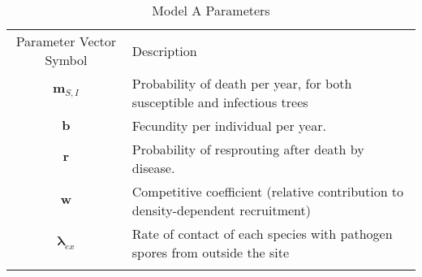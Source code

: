 \documentclass[english,nohyper,nofonts,nobib,nols,twoside]{tufte-handout}
\begin{document}
\begin{longtable}[c]{cl}
\hline\noalign{\medskip}
\begin{minipage}[b]{0.43\columnwidth}\centering
Parameter Vector Symbol
\end{minipage} & \begin{minipage}[b]{0.53\columnwidth}\raggedright
Description
\end{minipage}
\\\noalign{\medskip}
\hline\noalign{\medskip}
\begin{minipage}[t]{0.43\columnwidth}\centering
$\boldsymbol m_{S,I}$
\end{minipage} & \begin{minipage}[t]{0.53\columnwidth}\raggedright
Probability of death per year, for both susceptible and infectious trees
\end{minipage}
\\\noalign{\medskip}
\begin{minipage}[t]{0.43\columnwidth}\centering
$\boldsymbol b$
\end{minipage} & \begin{minipage}[t]{0.53\columnwidth}\raggedright
Fecundity per individual per year.
\end{minipage}
\\\noalign{\medskip}
\begin{minipage}[t]{0.43\columnwidth}\centering
$\boldsymbol r$
\end{minipage} & \begin{minipage}[t]{0.53\columnwidth}\raggedright
Probability of resprouting after death by disease.
\end{minipage}
\\\noalign{\medskip}
\begin{minipage}[t]{0.43\columnwidth}\centering
$\boldsymbol w$
\end{minipage} & \begin{minipage}[t]{0.53\columnwidth}\raggedright
Competitive coefficient (relative contribution to density-dependent
recruitment)
\end{minipage}
\\\noalign{\medskip}
\begin{minipage}[t]{0.43\columnwidth}\centering
$\boldsymbol \lambda_{ex}$
\end{minipage} & \begin{minipage}[t]{0.53\columnwidth}\raggedright
Rate of contact of each species with pathogen spores from outside the
site
\end{minipage}
\\\noalign{\medskip}
\hline
\noalign{\medskip}
\caption{Model A Parameters}
\end{longtable}
\end{document}
